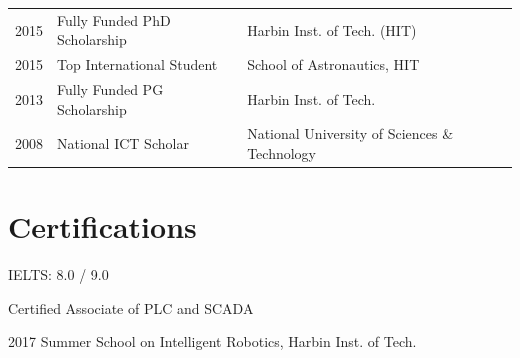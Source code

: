 \documentclass[a4paper]{deedy-resume} %
\begin{document}
\begin{minipage}[t]{0.66\textwidth}
\begin{tabular}{rll}
2015 & Fully Funded PhD Scholarship & Harbin Inst. of Tech. (HIT) \\
2015 & Top International Student & School of Astronautics, HIT \\
2013 & Fully Funded PG Scholarship & Harbin Inst. of Tech. \\
2008 & National ICT Scholar & National University of Sciences \& Technology
\end{tabular}

\sectionspace %


\section{Certifications}

\vspace{\topsep} %

\begin{tightitemize}
	\item IELTS: 8.0 / 9.0
	\item Certified Associate of PLC and SCADA
	\item 2017 Summer School on Intelligent Robotics, Harbin Inst. of Tech.
\end{tightitemize}






\end{minipage} %
\end{document}
